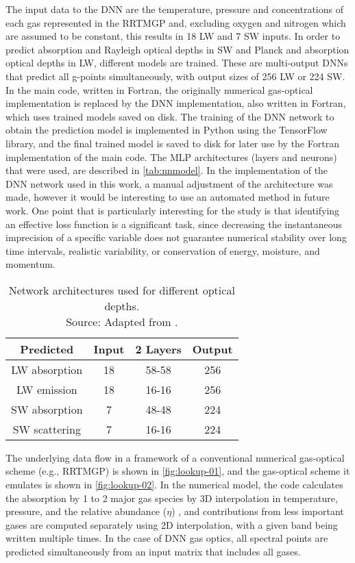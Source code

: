 The input data to the DNN are the temperature, pressure and concentrations of each gas represented in the RRTMGP and, excluding oxygen and nitrogen which are assumed to be constant, this results in 18 LW and 7 SW inputs. In order to predict absorption and Rayleigh optical depths in SW and Planck and absorption optical depths in LW, different models are trained. These are multi-output DNNs that predict all g-points simultaneously, with output sizes of 256 LW or 224 SW. 
In the main code, written in Fortran, the originally numerical gas-optical implementation is replaced by the DNN implementation, also written in Fortran, which uses trained models saved on disk.
The training of the DNN network to obtain the prediction model is implemented in Python using the TensorFlow library, and the final trained model is saved to disk for later use by the Fortran implementation of the main code.
The MLP architectures (layers and neurons) that were used, are described in \autoref{tab:nnmodel}.
In the implementation of the DNN network used in this work, a manual adjustment of the architecture was made, however it would be interesting to use an automated method in future work.
One point that is particularly interesting for the study is that identifying an effective loss function is a significant task, since decreasing the instantaneous imprecision of a specific variable does not guarantee numerical stability over long time intervals, realistic variability, or conservation of energy, moisture, and momentum.

\begin{table}[htb]\centering
\begin{tabular}{cccc}
\hline
     Predicted & Input & 2 Layers & Output \\
\hline
     LW absorption & 18 & 58-58 & 256 \\
     LW emission & 18 & 16-16 & 256 \\
     SW absorption & 7 & 48-48 & 224 \\
     SW scattering & 7 & 16-16 & 224 \\
\hline
\end{tabular}
\vspace{1em}
\caption{Network architectures used for different optical depths.\\
Source: Adapted from .}
\label{tab:nnmodel}
\end{table}

The underlying data flow in a framework of a conventional numerical gas-optical scheme (e.g., RRTMGP) is shown in \autoref{fig:lookup-01}, and the gas-optical scheme it emulates is shown in  \autoref{fig:lookup-02}. In the numerical model, the code calculates the absorption by 1 to 2 major gas species by 3D interpolation in temperature, pressure, and the relative abundance ($\eta$) \cite{Pincus2019}, and contributions from less important gases are computed separately using 2D interpolation, with a given band being written multiple times. In the case of DNN gas optics, all spectral points are predicted simultaneously from an input matrix that includes all gases.


